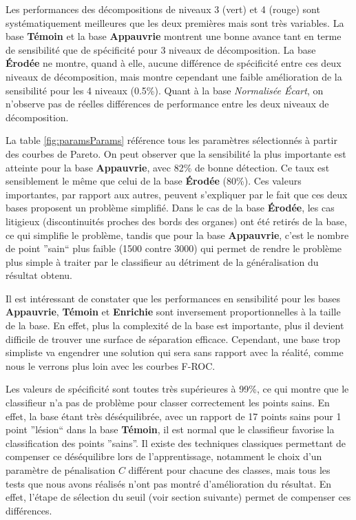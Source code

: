 Les performances des décompositions de niveaux 3 (vert) et 4 (rouge) sont systématiquement meilleures que les deux premières mais sont très variables. La base \textbf{Témoin} et la base \textbf{Appauvrie} montrent une bonne avance tant en terme de sensibilité que de spécificité pour 3 niveaux de décomposition. La base \textbf{Érodée} ne montre, quand à elle, aucune différence de spécificité entre ces deux niveaux de décomposition, mais montre cependant une faible amélioration de la sensibilité pour les 4 niveaux (0.5\%). Quant à la base \emph{Normalisée \'Ecart}, on n'observe pas de réelles différences de performance entre les deux niveaux de décomposition.

La table \ref{fig:paramsParams} référence tous les paramètres sélectionnés à partir des courbes de Pareto. On peut observer que la sensibilité la plus importante est atteinte pour la base \textbf{Appauvrie}, avec 82\% de bonne détection. Ce taux est sensiblement le même que celui de la base \textbf{Érodée} (80\%). Ces valeurs importantes, par rapport aux autres, peuvent s'expliquer par le fait que ces deux bases proposent un problème simplifié. Dans le cas de la base \textbf{Érodée}, les cas litigieux (discontinuités proches des bords des organes) ont été retirés de la base, ce qui simplifie le problème, tandis que pour la base \textbf{Appauvrie}, c'est le nombre de point ''sain`` plus faible (1500 contre 3000) qui permet de rendre le problème plus simple à traiter par le classifieur  au détriment de la généralisation du résultat obtenu.

Il est intéressant de constater que les performances en sensibilité pour les bases \textbf{Appauvrie}, \textbf{Témoin} et \textbf{Enrichie} sont inversement proportionnelles à la taille de la base. En effet, plus la complexité de la base est importante, plus il devient difficile de trouver une surface de séparation efficace. Cependant, une base trop simpliste va engendrer une solution qui sera sans rapport avec la réalité, comme nous le verrons plus loin avec les courbes F-ROC.

Les valeurs de spécificité sont toutes très supérieures à 99\%, ce qui montre que le classifieur n'a pas de problème pour classer correctement les points sains. En effet, la base étant très déséquilibrée, avec un rapport de 17 points sains pour 1 point ''lésion`` dans la base \textbf{Témoin}, il est normal que le classifieur favorise la classification des points ''sains''. Il existe des techniques classiques permettant de compenser ce déséquilibre lors de l'apprentissage, notamment le choix d'un paramètre de pénalisation $C$ différent pour chacune des classes, mais tous les tests que nous avons réalisés n'ont pas montré d'amélioration du résultat. En effet, l'étape de sélection du seuil (voir section suivante) permet de compenser ces différences.

